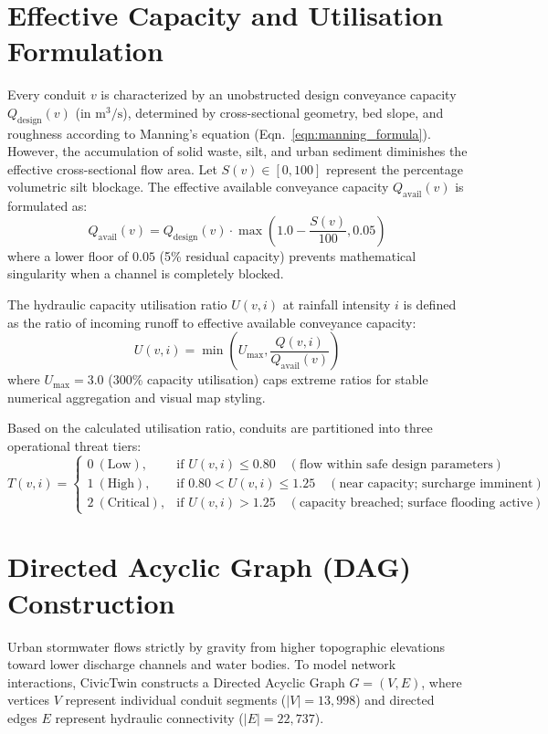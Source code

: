 \documentclass[12pt,a4paper]{report}
\begin{document}
\section{Effective Capacity and Utilisation Formulation}
Every conduit $v$ is characterized by an unobstructed design conveyance capacity $Q_{\text{design}}(v)$ (in $\text{m}^3/\text{s}$), determined by cross-sectional geometry, bed slope, and roughness according to Manning's equation (Eqn.~\ref{eqn:manning_formula}). However, the accumulation of solid waste, silt, and urban sediment diminishes the effective cross-sectional flow area. Let $S(v) \in [0, 100]$ represent the percentage volumetric silt blockage. The effective available conveyance capacity $Q_{\text{avail}}(v)$ is formulated as:
\begin{equation}
Q_{\text{avail}}(v) = Q_{\text{design}}(v) \cdot \max\left(1.0 - \frac{S(v)}{100}, 0.05\right)
\label{eqn:avail_capacity}
\end{equation}
where a lower floor of $0.05$ (5\% residual capacity) prevents mathematical singularity when a channel is completely blocked.

The hydraulic capacity utilisation ratio $U(v, i)$ at rainfall intensity $i$ is defined as the ratio of incoming runoff to effective available conveyance capacity:
\begin{equation}
U(v, i) = \min\left(U_{\max}, \frac{Q(v, i)}{Q_{\text{avail}}(v)}\right)
\label{eqn:utilisation_def}
\end{equation}
where $U_{\max} = 3.0$ (300\% capacity utilisation) caps extreme ratios for stable numerical aggregation and visual map styling. 

Based on the calculated utilisation ratio, conduits are partitioned into three operational threat tiers:
\begin{equation}
T(v, i) = \begin{cases}
0~(\text{Low}), & \text{if } U(v, i) \le 0.80 \quad (\text{flow within safe design parameters}) \\
1~(\text{High}), & \text{if } 0.80 < U(v, i) \le 1.25 \quad (\text{near capacity; surcharge imminent}) \\
2~(\text{Critical}), & \text{if } U(v, i) > 1.25 \quad (\text{capacity breached; surface flooding active})
\end{cases}
\label{eqn:threat_tier}
\end{equation}

\section{Directed Acyclic Graph (DAG) Construction}
Urban stormwater flows strictly by gravity from higher topographic elevations toward lower discharge channels and water bodies. To model network interactions, CivicTwin constructs a Directed Acyclic Graph $G = (V, E)$, where vertices $V$ represent individual conduit segments ($|V| = 13{,}998$) and directed edges $E$ represent hydraulic connectivity ($|E| = 22{,}737$).
\end{document}
